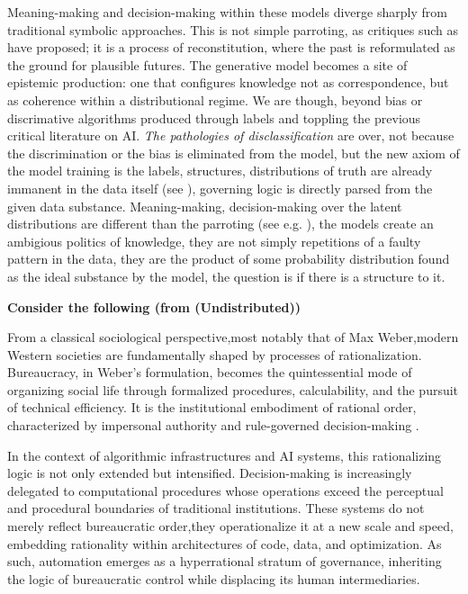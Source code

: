 Meaning-making and decision-making within these models diverge sharply from traditional symbolic approaches. %
This is not simple parroting, as critiques such as \textcite{bender2021b} have proposed; it is a process of reconstitution, where the past is reformulated as the ground for plausible futures. The generative model becomes a site of epistemic production: one that configures knowledge not as correspondence, but as coherence within a distributional regime. We are though, beyond bias or discrimative algorithms produced through labels and
toppling the previous critical literature on AI. \textit{The pathologies of
	disclassification} \parencite[3]{amoore2024} are over, not because the
discrimination or the bias is eliminated from the model, but the new axiom of
the model training is the labels, structures, distributions of truth are
already immanent in the data itself (see \cite[3]{amoore2024}), governing logic
is directly parsed from the given data substance. Meaning-making,
decision-making over the latent distributions are different than the parroting
(see e.g. \cite{bender2021b}), the models create an ambigious politics of
knowledge, they are not simply repetitions of a faulty pattern in the data,
they are the product of some probability distribution found as the ideal
substance by the model, the question is if there is a structure to it.


\begin{orangebox}
	\textbf{Consider the following (from (Undistributed))}

	From a classical sociological perspective,most notably that of Max Weber,modern Western societies are fundamentally shaped by processes of rationalization. Bureaucracy, in Weber’s formulation, becomes the quintessential mode of organizing social life through formalized procedures, calculability, and the pursuit of technical efficiency. It is the institutional embodiment of rational order, characterized by impersonal authority and rule-governed decision-making \parencite[46]{kivisto2013}.

	In the context of algorithmic infrastructures and AI systems, this rationalizing logic is not only extended but intensified. Decision-making is increasingly delegated to computational procedures whose operations exceed the perceptual and procedural boundaries of traditional institutions. These systems do not merely reflect bureaucratic order,they operationalize it at a new scale and speed, embedding rationality within architectures of code, data, and optimization. As such, automation emerges as a hyperrational stratum of governance, inheriting the logic of bureaucratic control while displacing its human intermediaries.
\end{orangebox}





